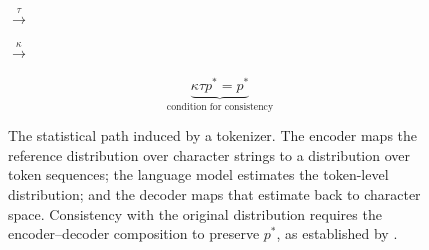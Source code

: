 
\begin{figure}[htbp]
    \centering
    \setlength{\fboxsep}{6pt}
    \setlength{\fboxrule}{0.5pt}
    \small
    \begin{minipage}[c]{0.245\textwidth}
        \centering
    \end{minipage}
    \(\xrightarrow{\ \tau\ }\)
    \begin{minipage}[c]{0.245\textwidth}
        \centering
    \end{minipage}
    \(\xrightarrow{\ \kappa\ }\)
    \begin{minipage}[c]{0.245\textwidth}
        \centering
    \end{minipage}

    \vspace{0.8em}
    \[
        \underbrace{\kappa\tau p^*=p^*}_{\text{condition for consistency}}
    \]
    \caption{The statistical path induced by a tokenizer. The encoder maps the reference distribution over character strings to a distribution over token sequences; the language model estimates the token-level distribution; and the decoder maps that estimate back to character space. Consistency with the original distribution requires the encoder--decoder composition to preserve \(p^*\), as established by \textcite{gastaldi2025foundations}.}
    \label{fig:tokenizer-mapping}
\end{figure}
